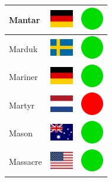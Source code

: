 \documentclass[12pt, a4paper, twoside]{report}
\begin{document}
\begin{center}
\begin{longtable}{|p{5cm}|p{2cm}|p{2cm}|}
 Mantar                                                     & \includegraphics[width=1cm]{../img/flags/de} &   \includegraphics[width=1cm]{../likes/y} \\ \hline
 Marduk                                                     & \includegraphics[width=1cm]{../img/flags/se} &   \includegraphics[width=1cm]{../likes/y} \\ \hline
 Mariner                                                    & \includegraphics[width=1cm]{../img/flags/de} &   \includegraphics[width=1cm]{../likes/y} \\ \hline
 Martyr                                                     & \includegraphics[width=1cm]{../img/flags/nl} &   \includegraphics[width=1cm]{../likes/n} \\ \hline
 Mason                                                      & \includegraphics[width=1cm]{../img/flags/au} &   \includegraphics[width=1cm]{../likes/y} \\ \hline
 Massacre                                                   & \includegraphics[width=1cm]{../img/flags/us} &   \includegraphics[width=1cm]{../likes/y} \\ \hline

\end{longtable}
\end{center}
\end{document}
